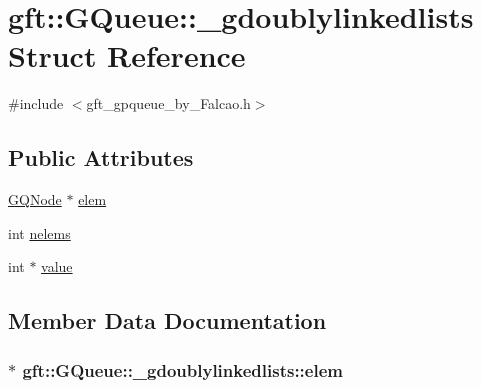 \hypertarget{structgft_1_1GQueue_1_1__gdoublylinkedlists}{}\section{gft\+:\+:G\+Queue\+:\+:\+\_\+gdoublylinkedlists Struct Reference}
\label{structgft_1_1GQueue_1_1__gdoublylinkedlists}


{\ttfamily \#include $<$gft\+\_\+gpqueue\+\_\+by\+\_\+\+Falcao.\+h$>$}

\subsection*{Public Attributes}
\begin{DoxyCompactItemize}
\item 
\hyperlink{namespacegft_1_1GQueue_ac7674cc67b8bc9f99e7be02c493f473e}{G\+Q\+Node} $\ast$ \hyperlink{structgft_1_1GQueue_1_1__gdoublylinkedlists_a381d0f6225cc5644302a285b7535e9d3}{elem}
\item 
int \hyperlink{structgft_1_1GQueue_1_1__gdoublylinkedlists_ab103b5cd4de4ad5b7053f05102c62595}{nelems}
\item 
int $\ast$ \hyperlink{structgft_1_1GQueue_1_1__gdoublylinkedlists_a0c1b6b1d931f88f969d1d6f1ee61828b}{value}
\end{DoxyCompactItemize}


\subsection{Member Data Documentation}
\subsubsection[{\texorpdfstring{elem}{elem}}]{$\ast$ gft\+::\+G\+Queue\+::\+\_\+gdoublylinkedlists\+::elem}\hypertarget{structgft_1_1GQueue_1_1__gdoublylinkedlists_a381d0f6225cc5644302a285b7535e9d3}{}\label{structgft_1_1GQueue_1_1__gdoublylinkedlists_a381d0f6225cc5644302a285b7535e9d3}
